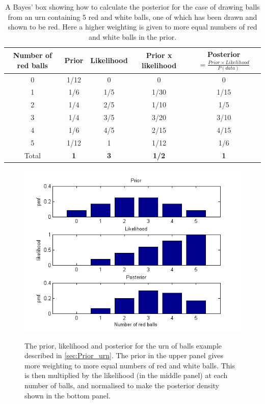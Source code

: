 \documentclass[11pt,fullpage]{book}
\begin{document}
\begin{table}[htbp]
  \centering
  \caption{A Bayes' box showing how to calculate the posterior for the case of drawing balls from an urn containing 5 red and white balls, one of which has been drawn and shown to be red. Here a higher weighting is given to more equal numbers of red and white balls in the prior.}\label{tab:Prior_bayesBoxUrnUpdated}%
    \begin{tabular}{ccccc}
    \toprule
    \textbf{Number of red balls} & \textbf{Prior} & \textbf{Likelihood} & \textbf{Prior x likelihood} & \textbf{Posterior$=\frac{Prior\times Likelihood}{P(data)}$} \\
    \midrule
    0     &   1/12 & 0     & 0       & 0       \\
    1     &   1/6  &  1/5  &   1/30 &   1/15 \\
    2     &   1/4  &  2/5  &   1/10 &   1/5  \\
    3     &   1/4  &  3/5  &   3/20 &   3/10 \\
    4     &   1/6  &  4/5  &   2/15 &   4/15 \\
    5     &   1/12 & 1     &   1/12 &   1/6  \\
    \bottomrule
    Total & \textbf{1      } & \textbf{3    } & \textbf{  1/2 } & \textbf{1      } \\
    \bottomrule
    \end{tabular}%
  
\end{table}%

\begin{figure}
\centering
\scalebox{0.75} 
{\includegraphics{Prior_bayesUrnUpdated.png}}\caption{The prior, likelihood and posterior for the urn of balls example described in \ref{sec:Prior_urn}. The prior in the upper panel gives more weighting to more equal numbers of red and white balls. This is then multiplied by the likelihood (in the middle panel) at each number of balls, and normalised to make the posterior density shown in the bottom panel.}\label{fig:Prior_bayesUrnUpdated}
\end{figure}
\end{document}
